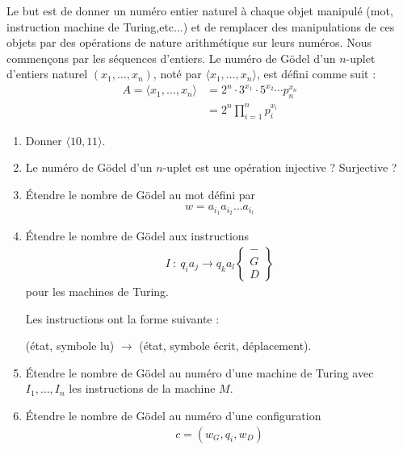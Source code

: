 \documentclass[french,a4paper,10pt]{article}
\begin{document}
	\begin{td-exo}[]
		Le but est de donner un numéro entier naturel à chaque objet manipulé (mot, instruction machine de Turing,etc...) et de remplacer des manipulations de ces objets par des opérations de nature arithmétique sur leurs numéros. Nous commençons par les séquences d'entiers. Le numéro de Gödel d'un $n$-uplet d'entiers naturel $(x_1,\dots,x_n)$, noté par $\langle x_1,\dots,x_n\rangle$, est défini comme suit :
			\[\begin{aligned}
				A=\langle x_1,\dots,x_n\rangle &= 2^n\cdot 3^{x_1}\cdot 5^{x_2}\cdots p_n^{x_n}\\
				&= 2^n\prod_{i=1}^n p_i^{x_i}
			\end{aligned}\]
		
		\begin{enumerate}
			\item Donner $\langle 10,11\rangle$.
			
			\item Le numéro de Gödel d'un $n$-uplet est une opération injective ? Surjective ?
			
			\item Étendre le nombre de Gödel au mot défini par 
				\[\begin{aligned}
					w=a_{i_1}a_{i_2}\dots a_{i_l}
				\end{aligned}\]
				
			\item Étendre le nombre de Gödel aux instructions
				\[\begin{aligned}
					I~\colon~ q_i a_j\to q_k a_l \left\{\begin{matrix}
						-\\G\\D
					\end{matrix}\right\}
				\end{aligned}\]
				pour les machines de Turing.
				\begin{rappel}
					Les instructions ont la forme suivante :
						\begin{center}
							(état, symbole lu) $\to$ (état, symbole écrit, déplacement).
						\end{center}
				\end{rappel}
				
			\item Étendre le nombre de Gödel au numéro d'une machine de Turing avec $I_1,\dots,I_n$ les instructions de la machine $M$.
			
			\item Étendre le nombre de Gödel au numéro d'une configuration
				\[\begin{aligned}
					c=(w_G,q_i,w_D)
				\end{aligned}\]
		\end{enumerate}
		
	\end{td-exo}
	
\end{document}
